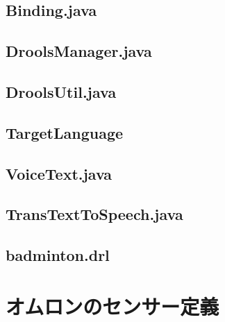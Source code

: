 \documentclass{kuisthesis}			%
\begin{document}
\subsection{Binding.java}


\subsection{DroolsManager.java}


\subsection{DroolsUtil.java}


\subsection{TargetLanguage}


\subsection{VoiceText.java}


\subsection{TransTextToSpeech.java}


\subsection{badminton.drl}


\section{オムロンのセンサー定義}
\end{document}

